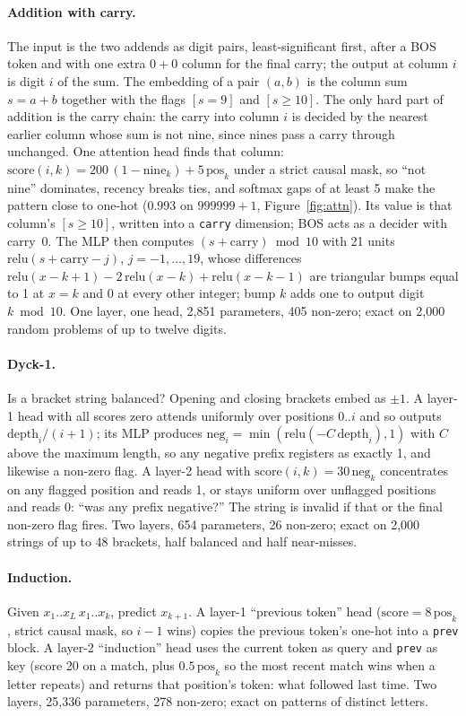 \paragraph{Addition with carry.} The input is the two addends as digit pairs,
least-significant first, after a BOS token and with one extra $0{+}0$ column for the
final carry; the output at column $i$ is digit $i$ of the sum. The embedding of a
pair $(a,b)$ is the column sum $s=a+b$ together with the flags $[s=9]$ and
$[s\ge10]$. The only hard part of addition is the carry chain: the carry into
column $i$ is decided by the nearest earlier column whose sum is not nine, since
nines pass a carry through unchanged. One attention head finds that column:
$\mathrm{score}(i,k) = 200\,(1-\mathrm{nine}_k) + 5\,\mathrm{pos}_k$ under a strict
causal mask, so ``not nine'' dominates, recency breaks ties, and softmax gaps of at
least 5 make the pattern close to one-hot (0.993 on $999999+1$,
Figure~\ref{fig:attn}). Its value is that column's $[s\ge10]$, written into a
\texttt{carry} dimension; BOS acts as a decider with carry~0. The MLP then
computes $(s+\mathrm{carry}) \bmod 10$ with 21 units $\mathrm{relu}(s+\mathrm{carry}-j)$,
$j=-1,\dots,19$, whose differences $\mathrm{relu}(x-k+1)-2\,\mathrm{relu}(x-k)+\mathrm{relu}(x-k-1)$
are triangular bumps equal to 1 at $x=k$ and 0 at every other integer; bump $k$
adds one to output digit $k \bmod 10$. One layer, one head, 2{,}851 parameters, 405
non-zero; exact on 2{,}000 random problems of up to twelve digits.

\paragraph{Dyck-1.} Is a bracket string balanced? Opening and closing brackets
embed as $\pm1$. A layer-1 head with all scores zero attends uniformly over
positions $0..i$ and so outputs $\mathrm{depth}_i/(i+1)$; its MLP produces
$\mathrm{neg}_i=\min(\mathrm{relu}(-C\,\mathrm{depth}_i),1)$ with $C$ above the
maximum length, so any negative prefix registers as exactly 1, and likewise a
non-zero flag. A layer-2 head with $\mathrm{score}(i,k)=30\,\mathrm{neg}_k$
concentrates on any flagged position and reads 1, or stays uniform over unflagged
positions and reads 0: ``was any prefix negative?'' The string is invalid if that
or the final non-zero flag fires. Two layers, 654 parameters, 26 non-zero; exact
on 2{,}000 strings of up to 48 brackets, half balanced and half near-misses.

\paragraph{Induction.} Given $x_1..x_L\,x_1..x_k$, predict $x_{k+1}$. A layer-1
``previous token'' head ($\mathrm{score}=8\,\mathrm{pos}_k$, strict causal mask, so
$i-1$ wins) copies the previous token's one-hot into a \texttt{prev} block. A
layer-2 ``induction'' head uses the current token as query and \texttt{prev} as key
(score 20 on a match, plus $0.5\,\mathrm{pos}_k$ so the most recent match wins when
a letter repeats) and returns that position's token: what followed last time. Two
layers, 25{,}336 parameters, 278 non-zero; exact on patterns of distinct letters.

